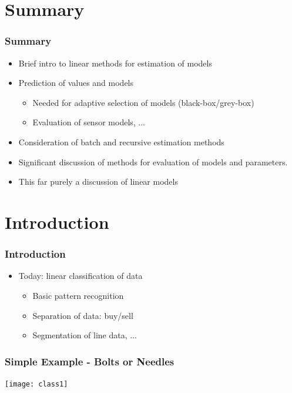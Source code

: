 \documentclass[10pt]{beamer}
\begin{document}
\section{Summary}

\begin{frame}
  \frametitle{Summary}
  \begin{itemize}
  \item Brief intro to linear methods for estimation of models
  \item Prediction of values and models
    \begin{itemize}
    \item Needed for adaptive selection of models (black-box/grey-box)
    \item Evaluation of sensor models, ...
    \end{itemize}
  \item Consideration of batch and recursive estimation methods
  \item Significant discussion of methods for evaluation of models and
    parameters.
  \item This far purely a discussion of linear models
  \end{itemize}
\end{frame}


\section{Introduction}

\begin{frame}
  \frametitle{Introduction}
  \begin{itemize}
  \item Today: linear classification of data
    \begin{itemize}
    \item Basic pattern recognition
    \item Separation of data: buy/sell
    \item Segmentation of line data, ...
    \end{itemize}
  \end{itemize}
\end{frame}

\begin{frame}
  \frametitle{Simple Example - Bolts or Needles}
  \begin{center}
    \texttt{[image: class1]}
  \end{center}
\end{frame}
\end{document}
